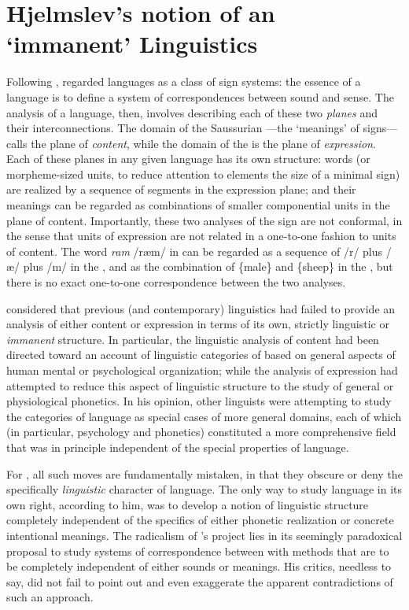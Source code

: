 \section{Hjelmslev's notion of an `immanent' Linguistics}

Following {\Saussure}, {\Hjelmslev} regarded languages as a class of sign
systems: the essence of a language is to define a system of
correspondences between sound and sense. The analysis of a language,
then, involves describing each of these two \emph{planes} and their
interconnections. The domain of the Saussurian \emph{}—the
`meanings' of signs—{\Hjelmslev} calls the plane of \emph{content}, while
the domain of the \emph{} is the plane of
\emph{expression}. Each of these planes in any given language has its
own structure: words (or morpheme-sized units, to reduce attention to
elements the size of a minimal sign) are realized by a sequence of
segments in the expression plane; and their meanings can be regarded
as combinations of smaller componential units in the plane of
content. Importantly, these two analyses of the sign are not
conformal, in the sense that units of expression are not related in a
one-to-one fashion to units of content. The word \emph{ram} /ræm/ in
 can be regarded as a sequence of /r/ plus /æ/ plus /m/ in the
, and as the combination of \{male\} and
\{sheep\} in the , but there is no exact one-to-one
correspondence between the two analyses.

{\Hjelmslev} considered that previous (and contemporary) linguistics had
failed to provide an analysis of either content or expression in terms
of its own, strictly linguistic or \emph{immanent} structure. In particular,
the linguistic analysis of content had been directed toward an account
of linguistic categories of  based on general aspects of human
mental or psychological organization; while the analysis of expression
had attempted to reduce this aspect of linguistic structure to the
study of general  or physiological phonetics. In his opinion,
other linguists were attempting to study the categories of language as
special cases of more general domains, each of which (in particular,
psychology and phonetics) constituted a more comprehensive field that
was in principle independent of the special properties of language.

For {\Hjelmslev}, all such moves are fundamentally mistaken, in that they
obscure or deny the specifically \emph{linguistic} character of
language. The only way to study language in its own right, according
to him, was to develop a notion of linguistic structure completely
independent of the specifics of either phonetic realization or
concrete intentional meanings. The radicalism of {\Hjelmslev}'s project
lies in its seemingly paradoxical proposal to study systems of
correspondence between  with methods that are to be
completely independent of either sounds or meanings. His critics,
needless to say, did not fail to point out and even exaggerate the
apparent contradictions of such an approach.

